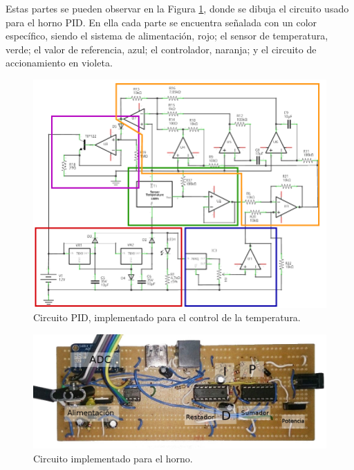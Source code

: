 \documentclass{wileysix}
\begin{document}
Estas partes se pueden observar en la Figura \ref{fig: circuito}, donde se dibuja el circuito usado para el horno PID. En ella cada parte se encuentra se\~nalada con un color espec\'ifico, siendo el sistema de alimentaci\'on, rojo; el sensor de temperatura, verde; el valor de referencia, azul; el controlador, naranja; y el circuito de accionamiento en violeta. 
\begin{figure}[h]
	\centering
	\includegraphics[width=\linewidth]{extras/circuit_schem.pdf}
	\caption{Circuito PID, implementado para el control de la temperatura.}
	\label{fig: circuito}
\end{figure}
\begin{figure}[h]
	\centering
	\includegraphics[width=\linewidth]{extras/circuit.jpg}
	\caption{Circuito implementado para el horno.}
\end{figure}
\end{document}
